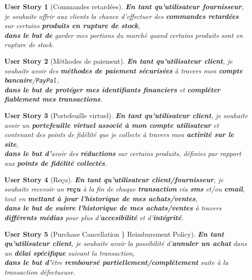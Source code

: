 \documentclass[a4paper,12pt]{report}
\theoremstyle{break}
\newtheorem*{userStory}{User Story}
\theoremstyle{break}
\theoremstyle{break}
\theoremstyle{break}
\theoremstyle{definition}
\theoremstyle{remark}
\begin{document}
\begin{userStory}[Commandes retardées]
\textbf{En tant qu'utilisateur {\color{red}fournisseur}}, je souhaite offrir aux clients la chance d'effectuer des \textbf{commandes retardées} sur certains \textbf{produits en rupture de stock},\\
\indent
\textbf{dans le but de} garder mes portions du marché quand certains produits sont en rupture de stock.
\end{userStory}

\begin{userStory}[Méthodes de paiement]
\textbf{En tant qu'utilisateur {\color{green}client}}, je souhaite avoir des \textbf{méthodes de paiement sécurisées} à travers mon \textbf{compte bancaire}/\texttt{PayPal},\\
\indent
\textbf{dans le but de protéger mes identifiants financiers} et \textbf{compléter fiablement mes transactions}.
\end{userStory}

\begin{userStory}[Portefeuille virtuel]
\textbf{En tant qu'utilisateur {\color{green}client}}, je souhaite avoir un \textbf{portefeuille virtuel associé à mon compte utilisateur} et contenant des points de fidélité que je collecte à travers mon \textbf{activité sur le site},\\
\indent
\textbf{dans le but d'}avoir des \textbf{réductions} sur certains produits, définies par rapport aux \textbf{points de fidélité collectés}.
\end{userStory}

\begin{userStory}[Reçu]
\textbf{En tant qu'utilisateur {\color{green}client}/{\color{red}fournisseur}}, je souhaite recevoir un \textbf{reçu} à la fin de chaque \textbf{transaction} via \textbf{sms} et/ou \textbf{email}, tout en \textbf{mettant à jour l'historique de mes achats/ventes},\\
\indent
\textbf{dans le but de suivre l'historique de mes achats/ventes} à travers \textbf{différents médias} pour plus d'\textbf{accesibilité} et d'\textbf{intégrité}.
\end{userStory}

\begin{userStory}[Purchase Cancellation \} Reimbursment Policy]
\textbf{En tant qu'utilisateur {\color{green}client}}, je souhaite avoir la possibilité d'\textbf{annuler un achat} dans un \textbf{délai spécifique} suivant la transaction,\\
\indent
\textbf{dans le but d'}être \textbf{remboursé partiellement/complétement} suite à la transaction défectueuse.
\end{userStory}
\end{document}
